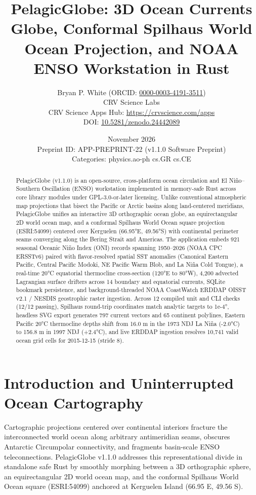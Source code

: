 \documentclass[10pt,letterpaper]{article}
\title{\textbf{PelagicGlobe: 3D Ocean Currents Globe, Conformal Spilhaus World Ocean Projection, and NOAA ENSO Workstation in Rust}}
\author{Bryan P. White (ORCID: \href{https://orcid.org/0000-0003-4191-3511}{0000-0003-4191-3511}) \\ CRV Science Labs \\ \small CRV Science Apps Hub: \url{https://crvscience.com/apps} \\ \small DOI: \href{https://doi.org/10.5281/zenodo.24442089}{10.5281/zenodo.24442089}}
\date{November 2026 \\ \small Preprint ID: APP-PREPRINT-22 (v1.1.0 Software Preprint) \\ \small Categories: physics.ao-ph \textbullet{} cs.GR \textbullet{} cs.CE}
\begin{document}
\maketitle

\begin{abstract}
PelagicGlobe (v1.1.0) is an open-source, cross-platform ocean circulation and El Niño--Southern Oscillation (ENSO) workstation implemented in memory-safe Rust across core library modules under GPL-3.0-or-later licensing. Unlike conventional atmospheric map projections that bisect the Pacific or Arctic basins along land-centered meridians, PelagicGlobe unifies an interactive 3D orthographic ocean globe, an equirectangular 2D world ocean map, and a conformal Spilhaus World Ocean square projection (ESRI:54099) centered over Kerguelen (66.95°E, 49.56°S) with continental perimeter seams converging along the Bering Strait and Americas. The application embeds 921 seasonal Oceanic Niño Index (ONI) records spanning 1950--2026 (NOAA CPC ERSSTv6) paired with flavor-resolved spatial SST anomalies (Canonical Eastern Pacific, Central Pacific Modoki, NE Pacific Warm Blob, and La Niña Cold Tongue), a real-time 20°C equatorial thermocline cross-section (120°E to 80°W), 4,200 advected Lagrangian surface drifters across 14 boundary and equatorial currents, SQLite bookmark persistence, and background-threaded NOAA CoastWatch ERDDAP OISST v2.1 / NESDIS geostrophic raster ingestion. Across 12 compiled unit and CLI checks (12/12 passing), Spilhaus round-trip coordinates match analytic targets to 1e-4°, headless SVG export generates 797 current vectors and 65 continent polylines, Eastern Pacific 20°C thermocline depths shift from 16.0 m in the 1973 NDJ La Niña (-2.0°C) to 156.8 m in 1997 NDJ (+2.4°C), and live ERDDAP ingestion resolves 10,741 valid ocean grid cells for 2015-12-15 (stride 8).
\end{abstract}

\section{Introduction and Uninterrupted Ocean Cartography}
Cartographic projections centered over continental interiors fracture the interconnected world ocean along arbitrary antimeridian seams, obscures Antarctic Circumpolar connectivity, and fragments basin-scale ENSO teleconnections. PelagicGlobe v1.1.0 addresses this representational divide in standalone safe Rust by smoothly morphing between a 3D orthographic sphere, an equirectangular 2D world ocean map, and the conformal Spilhaus World Ocean square (ESRI:54099) anchored at Kerguelen Island (66.95 E, 49.56 S).
\end{document}
